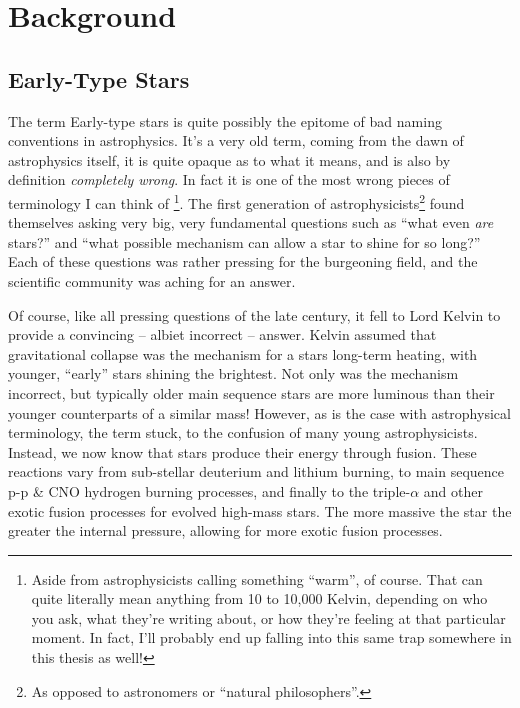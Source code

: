 \chapter{Background}
\label{ch:background}

\section{Early-Type Stars}
\label{sec:earlytype}
\label{sec:obtype}

The term Early-type stars is quite possibly the epitome of bad naming conventions in astrophysics.
It's a very old term, coming from the dawn of astrophysics itself, it is quite opaque as to what it means, and is also by definition \textit{completely wrong}.
In fact it is one of the most wrong pieces of terminology I can think of
\footnote{Aside from astrophysicists calling something ``warm'', of course. That can quite literally mean anything from 10 to 10,000 Kelvin, depending on who you ask, what they're writing about, or how they're feeling at that particular moment. In fact, I'll probably end up falling into this same trap somewhere in this thesis as well!}.
The first generation of astrophysicists\footnote{As opposed to astronomers or ``natural philosophers''.} found themselves asking very big, very fundamental questions such as ``what even \textit{are} stars?'' and ``what possible mechanism can allow a star to shine for so long?''
Each of these questions was rather pressing for the burgeoning field, and the scientific community was aching for an answer.

Of course, like all pressing questions of the late  century, it fell to Lord Kelvin to provide a convincing -- albiet incorrect -- answer.
Kelvin assumed that gravitational collapse was the mechanism for a stars long-term heating, with younger, ``early'' stars shining the brightest.
Not only was the mechanism incorrect, but typically older main sequence stars are more luminous than their younger counterparts of a similar mass!
However, as is the case with astrophysical terminology, the term stuck, to the confusion of many young astrophysicists.
Instead, we now know that stars produce their energy through fusion.
These reactions vary from sub-stellar deuterium and lithium burning, to main sequence p-p \& CNO hydrogen burning processes, and finally to the triple-$\alpha$ and other exotic fusion processes for evolved high-mass stars.
The more massive the star the greater the internal pressure, allowing for more exotic fusion processes.

